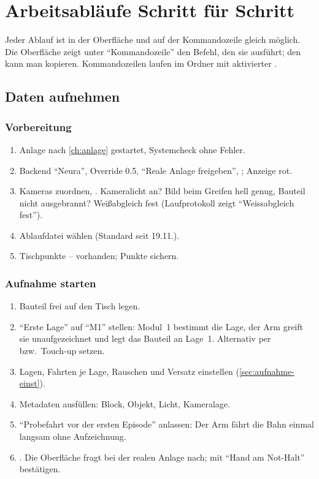 \chapter{Arbeitsabläufe Schritt für Schritt}
\label{ch:ablaeufe}

Jeder Ablauf ist in der Oberfläche und auf der Kommandozeile gleich möglich. Die Oberfläche
zeigt unter \enquote{Kommandozeile} den Befehl, den sie ausführt; den kann man kopieren.
Kommandozeilen laufen im Ordner  mit aktivierter
.

\section{Daten aufnehmen}
\label{sec:aufnehmen}

\subsection{Vorbereitung}
\begin{enumerate}
  \item Anlage nach \cref{ch:anlage} gestartet, Systemcheck ohne Fehler.
  \item Backend \enquote{Neura}, Override \num{0.5}, \enquote{Reale Anlage freigeben},
    ; Anzeige rot.
  \item Kameras zuordnen, . Kameralicht an? Bild beim Greifen hell
    genug, Bauteil nicht ausgebrannt? Weißabgleich fest (Laufprotokoll zeigt
    \enquote{Weissabgleich fest}).
  \item Ablaufdatei  wählen (Standard seit 19.11.).
  \item Tischpunkte -- vorhanden; Punkte sichern.
\end{enumerate}

\subsection{Aufnahme starten}
\begin{enumerate}
  \item Bauteil frei auf den Tisch legen.
  \item \enquote{Erste Lage} auf \enquote{M1} stellen: Modul~1 bestimmt die Lage, der Arm greift
    sie unaufgezeichnet und legt das Bauteil an Lage~1. Alternativ  per
     bzw.\ Touch-up setzen.
  \item Lagen, Fahrten je Lage, Rauschen und Versatz einstellen (\cref{sec:aufnahme-einst}).
  \item Metadaten ausfüllen: Block, Objekt, Licht, Kameralage.
  \item \enquote{Probefahrt vor der ersten Episode} anlassen: Der Arm fährt die Bahn einmal
    langsam ohne Aufzeichnung.
  \item {}. Die Oberfläche fragt bei der realen Anlage nach; mit
    \enquote{Hand am Not-Halt} bestätigen.
\end{enumerate}


